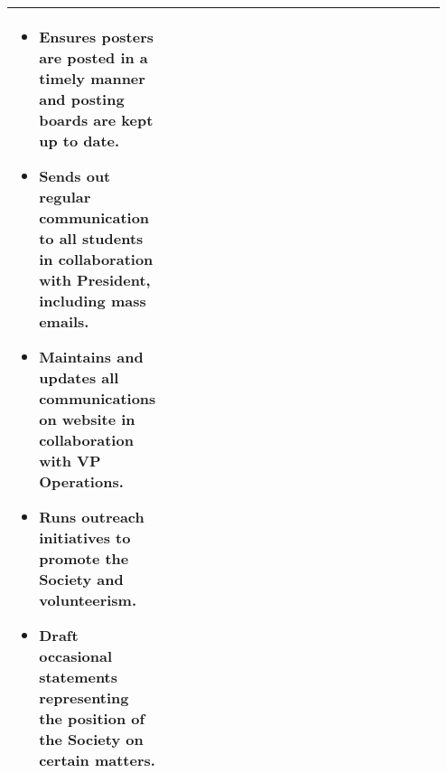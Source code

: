 \begin{longtable}{p{0.3\linewidth} p{0.65\linewidth}}
\begin{itemize}
\item Ensures posters are posted in a timely manner and posting boards are kept up to date.
\item Sends out regular communication to all students in collaboration with President, including mass emails.
\item Maintains and updates all communications on website in collaboration with VP Operations.
\item Runs outreach initiatives to promote the Society and volunteerism.
\item Draft occasional statements representing the position of the Society on certain matters.
\end{itemize}
\\
\bottomrule
\end{longtable}
